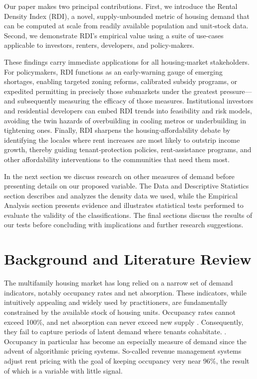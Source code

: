 \documentclass[APA,Times1COL]{WileyNJDv5} %
\begin{document}
Our paper makes two principal contributions. First, we introduce the Rental Density Index (RDI), a novel, supply-unbounded metric of housing demand that can be computed at scale from readily available population and unit‐stock data. Second, we demonstrate RDI’s empirical value using a suite of use-cases applicable to investors, renters, developers, and policy-makers.

These findings carry immediate applications for all housing‐market stakeholders. For policymakers, RDI functions as an early-warning gauge of emerging shortages, enabling targeted zoning reforms, calibrated subsidy programs, or expedited permitting in precisely those submarkets under the greatest pressure—and subsequently measuring the efficacy of those measures. Institutional investors and residential developers can embed RDI trends into feasibility and risk models, avoiding the twin hazards of overbuilding in cooling metros or underbuilding in tightening ones. Finally, RDI sharpens the housing‐affordability debate by identifying the locales where rent increases are most likely to outstrip income growth, thereby guiding tenant‐protection policies, rent‐assistance programs, and other affordability interventions to the communities that need them most.

In the next section we discuss research on other measures of demand before presenting details on our proposed variable. The Data and Descriptive Statistics section describes and analyzes the density data we used, while the Empirical Analysis section presents evidence and illustrates statistical tests performed to evaluate the validity of the classifications. The final sections discuss the results of our tests before concluding with implications and further research suggestions. 

\section{Background and Literature Review}\label{sec2}

The multifamily housing market has long relied on a narrow set of demand indicators, notably occupancy rates and net absorption. These indicators, while intuitively appealing and widely used by practitioners, are fundamentally constrained by the available stock of housing units. Occupancy rates cannot exceed 100\%, and net absorption can never exceed new supply \cite{mueller1999real, gabriel2001rental}. Consequently, they fail to capture periods of latent demand where tenants cohabitate. \cite{sirmans1991determinants, pyhrr1999real}. Occupancy in particular has become an especially measure of demand since the advent of algorithmic pricing systems. So-called revenue management systems adjust rent pricing with the goal of keeping occupancy very near 96\%, \cite{calder2024coordinated} the result of which is a variable with little signal. 
\end{document}
